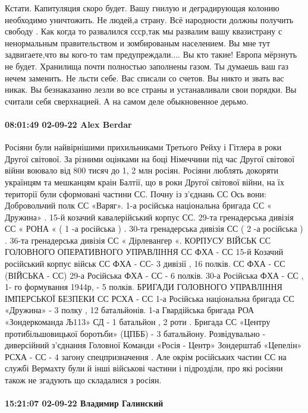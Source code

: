 Кстати. Капитуляция скоро будет. Вашу гнилую и деградирующая колонию необходимо
уничтожить. Не людей,а страну. Всё народности должны получить свободу . Как
когда то развалился ссср,так мы развалим вашу квазистрану с ненормальным
правительством и зомбированым населением. Вы мне тут задвигаете,что вы кого-то
там предупреждали.... Вы кто такие! Европа мёрзнуть не будет. Хранилища почти
полностью заполнены газом. Ты думаешь ваш газ нечем заменить. Не льсти себе.
Вас списали со счетов. Вы никто и звать вас никак. Вы безнаказанно лезли во все
страны и устанавливали свои порядки. Вы считали себя сверхнацией. А на самом
деле обыкновенное дерьмо.

\paragraph{08:01:49 02-09-22 Alex Berdar}

Росіяни були найвірнішими прихильниками Третього Рейху і Гітлера в роки Другої світової. За різними оцінками на боці Німеччини під час Другої світової війни воювало від 800 тисяч до 1, 2 млн росіян. Росіяни люблять докоряти українцям та мешканцям краін Балтії, що в роки Другої світової війни, на їх території були сформовані частини СС. Почну із з’єднань СС
Ось вони:
Добровольчий полк СС «Варяг».
1-а російська національна бригада СС « Дружина» .
15-й козачий кавалерійський корпус СС.
29-та гренадерська дивізія СС « РОНА « ( 1 -а російська ) .
30-та гренадерська дивізія СС ( 2 -а російська ) .
36-та гренадерська дивізія СС « Дірлевангер «.
КОРПУСУ ВІЙСЬК СС ГОЛОВНОГО ОПЕРАТИВНОГО УПРАВЛІННЯ СС ФХА - СС
15-й Козачий російський корпус військ СС ФХА - СС- 3 дивізії , 16 полків.
СС ФХА - СС (ВІЙСЬКА - СС)
29-а Російська ФХА - СС - 6 полків.
30-а Російська ФХА - СС , 1- го формування 1944р, - 5 полків.
БРИГАДИ ГОЛОВНОГО УПРАВЛІННЯ ІМПЕРСЬКОЇ БЕЗПЕКИ СС РСХА - СС
1-а Російська національна бригада СС «Дружина» - 3 полку , 12 батальйонів.
1-а Гвардійська бригада РОА «Зондеркоманда Љ113» СД - 1 батальйон , 2 роти .
Бригада СС «Центру протибільшовицької боротьби» (ЦПББ) - 3 батальйону.
Розвідувально - диверсійний з'єднання Головної Команди «Росія - Центр» Зондерштаб «Цепелін» РСХА - СС - 4 загону спецпризначення .
Але окрім російських частин СС на службі Вермахту були й інші військові частини і підрозділи, про які росіяни також не згадують що складалися з росіян.


\paragraph{15:21:07 02-09-22 Владимир Галинский}

